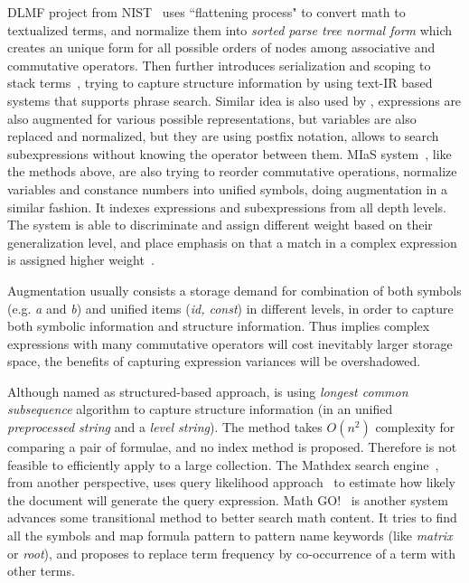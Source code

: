 DLMF project from NIST~\cite{Youssef03} uses ``flattening process" to convert math to textualized terms, and normalize them into \textit{sorted parse tree normal form} which creates an unique form for all possible orders of nodes among associative and commutative operators. 
Then further introduces serialization and scoping to stack terms~\cite{Youssef05}, trying to capture structure information by using text-IR based systems that supports phrase search. 
Similar idea is also used by \cite{extending08}, expressions are also augmented for various possible representations, but variables are also replaced and normalized, but they are using postfix notation, allows to search subexpressions without knowing the operator between them.  
MIaS system~\cite{mias11a,mias11,mias:thesis}, like the methods above, are also trying to reorder commutative operations, normalize variables and constance numbers into unified symbols, doing augmentation in a similar fashion. 
It indexes expressions and subexpressions from all depth levels. The system is able to discriminate and assign different weight based on their generalization level, and place emphasis on that a match in a complex expression is assigned higher weight~\cite{mias:thesis}.

Augmentation usually consists a storage demand for combination of both symbols (e.g. \textit{a} and \textit{b}) and unified items (\textit{id, const}) in different levels, in order to capture both symbolic information and structure information. Thus implies complex expressions with many commutative operators will cost inevitably larger storage space, the benefits of capturing expression variances will be overshadowed.

Although named as structured-based approach, \cite{not-really-struct} is using \textit{longest common subsequence} algorithm to capture structure information (in an unified \textit{preprocessed string} and a \textit{level string}). The method takes $O(n^2)$ complexity for comparing a pair of formulae, and no index method is proposed. Therefore is not feasible to efficiently apply to a large collection.
The Mathdex search engine~\cite{queryf_datan07}, from another perspective, uses query likelihood approach~\cite{iir} to estimate how likely the document will generate the query expression.
Math GO!~\cite{Adeel_mathgo} is another system advances some transitional method to better search math content. It tries to find all the symbols and map formula pattern to pattern name keywords (like \textit{matrix} or \textit{root}), and proposes to replace term frequency by co-occurrence of a term with other terms.

